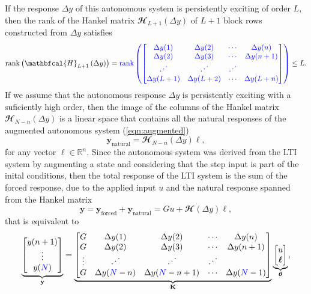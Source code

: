 If the response $\Delta {y}$ \color{blue} of this autonomous system \color{black}  is persistently exciting of order $L$, then the rank of the Hankel matrix $\mathbfcal{H}_{L+1}(\Delta {y})$ of $L+1$ block rows constructed from $\Delta {y}$ satisfies
\begin{equation} \mathrm{rank} \left( \mathbfcal{H}_{L+1} \left( \Delta {y} \right) \right) = \color{blue} \mathrm{rank} \left( \begin{bmatrix} \Delta y(1) & \Delta y(2) & \cdots & \Delta y(n) \\ \Delta y(2) & \Delta y(3) & \cdots & \Delta y(n+1) \\ \iddots & \iddots & \iddots \\ \Delta y(L+1) & \Delta y(L+2) & \cdots & \Delta y(L+n) \end{bmatrix} \right) \color{black} \leq L.  \end{equation}
\color{blue}If we assume that the autonomous response $\Delta {y}$ is persistently exciting with a suficiently high order, then the image of the columns of the Hankel matrix $\mathbfcal{H}_{N-n}(\Delta {y})$ is a linear space that contains all the natural responses of the augmented autonomous system (\ref{eqn:augmented}) 
\begin{equation} \mathbf{y}_{\mathrm{natural}} = \mathbfcal{H}_{N-n}\left(\Delta {y}\right) \bm{\ell}, \end{equation}
for any vector $\bm{\ell} \in \mathbb{R}^{n}$.
Since the autonomous system was derived from the LTI system by augmenting a state and considering that the step input is part of the inital conditions,
then the total response of the LTI system is the sum of the forced response, due to the applied input ${u}$ and the natural response spanned from the Hankel matrix
\begin{equation} \mathbf{y} = \mathbf{y}_{\mathrm{forced}}+ \mathbf{y}_{\mathrm{natural}} =G {u} + \mathbfcal{H}\left(\Delta {y}\right) \bm{\ell} ,  \end{equation} \color{black}
that is equivalent to
\begin{equation} \underbrace{ \begin{bmatrix} y(n+1) \\ \vdots \\ y(\color{blue}N\color{black}) \end{bmatrix}}_{\mathbf{y}} = \underbrace{ \begin{bmatrix} G & \Delta y(1) & \Delta y(2) & \cdots & \Delta y(n) \\ G & \Delta y(2) & \Delta y(3) & \cdots & \Delta y(n+1) \\ \vdots & \iddots & \iddots & \iddots \\ G & \Delta y(\color{blue}N\color{black}-n) & \Delta y(\color{blue}N\color{black}-n+1) & \cdots & \Delta y(\color{blue}N\color{black}-1) \end{bmatrix} }_{\mathbf{K}} \underbrace{ \begin{bmatrix} {{u}} \\ \bm{\ell} \end{bmatrix} }_{\bm{\theta}} , \label{eqn:ddsiemexd} \end{equation}
